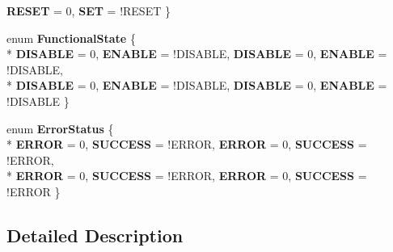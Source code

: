 \begin{DoxyCompactItemize}
{\bfseries R\-E\-S\-E\-T} = 0, 
{\bfseries S\-E\-T} = !\-R\-E\-S\-E\-T
 \}
\item 
enum {\bfseries Functional\-State} \{ \\*
{\bfseries D\-I\-S\-A\-B\-L\-E} = 0, 
{\bfseries E\-N\-A\-B\-L\-E} = !\-D\-I\-S\-A\-B\-L\-E, 
{\bfseries D\-I\-S\-A\-B\-L\-E} = 0, 
{\bfseries E\-N\-A\-B\-L\-E} = !\-D\-I\-S\-A\-B\-L\-E, 
\\*
{\bfseries D\-I\-S\-A\-B\-L\-E} = 0, 
{\bfseries E\-N\-A\-B\-L\-E} = !\-D\-I\-S\-A\-B\-L\-E, 
{\bfseries D\-I\-S\-A\-B\-L\-E} = 0, 
{\bfseries E\-N\-A\-B\-L\-E} = !\-D\-I\-S\-A\-B\-L\-E
 \}
\item 
enum {\bfseries Error\-Status} \{ \\*
{\bfseries E\-R\-R\-O\-R} = 0, 
{\bfseries S\-U\-C\-C\-E\-S\-S} = !\-E\-R\-R\-O\-R, 
{\bfseries E\-R\-R\-O\-R} = 0, 
{\bfseries S\-U\-C\-C\-E\-S\-S} = !\-E\-R\-R\-O\-R, 
\\*
{\bfseries E\-R\-R\-O\-R} = 0, 
{\bfseries S\-U\-C\-C\-E\-S\-S} = !\-E\-R\-R\-O\-R, 
{\bfseries E\-R\-R\-O\-R} = 0, 
{\bfseries S\-U\-C\-C\-E\-S\-S} = !\-E\-R\-R\-O\-R
 \}
\end{DoxyCompactItemize}


\subsection{Detailed Description}


